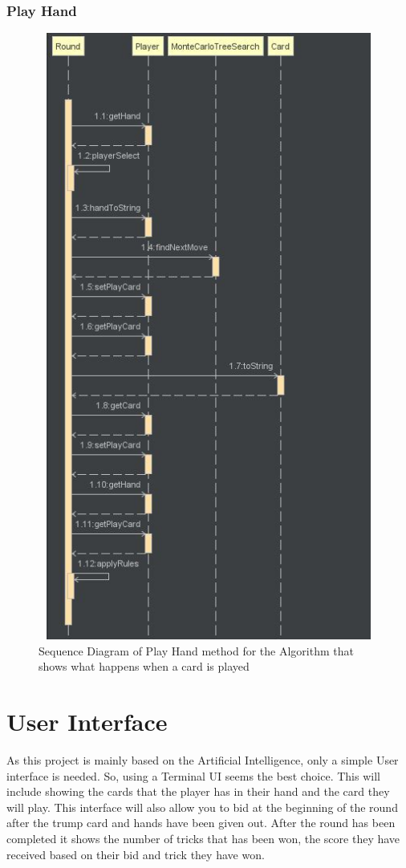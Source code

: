 \subsubsection{Play Hand}
\begin{figure}
\centering
\label{fig:Play}
\includegraphics[width=15cm ,height=20cm,keepaspectratio]{PlayHandSequenceDiagram}
\caption{Sequence Diagram of Play Hand method for the Algorithm that shows what happens when a card is played}
\end{figure}
\section{User Interface}
As this project is mainly based on the Artificial Intelligence, only a simple User interface is needed. So, using a Terminal UI seems the best choice. This will include showing the cards that the player has in their hand and the card they will play. This interface will also allow you to bid at the beginning of the round after the trump card and hands have been given out. After the round has been completed it shows the number of tricks that has been won, the score they have received based on their bid and trick they have won.



